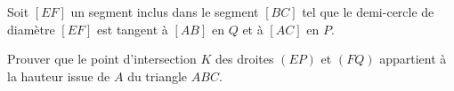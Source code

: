 Soit $[EF]$ un segment inclus dans le segment $[BC]$ tel que le demi-cercle de diamètre $[EF]$ est tangent à $[AB]$ en $Q$ et à $[AC]$ en $P$.

Prouver que le point d'intersection $K$ des droites $(EP)$ et $(FQ)$ appartient à la hauteur issue de $A$ du triangle $ABC$.
